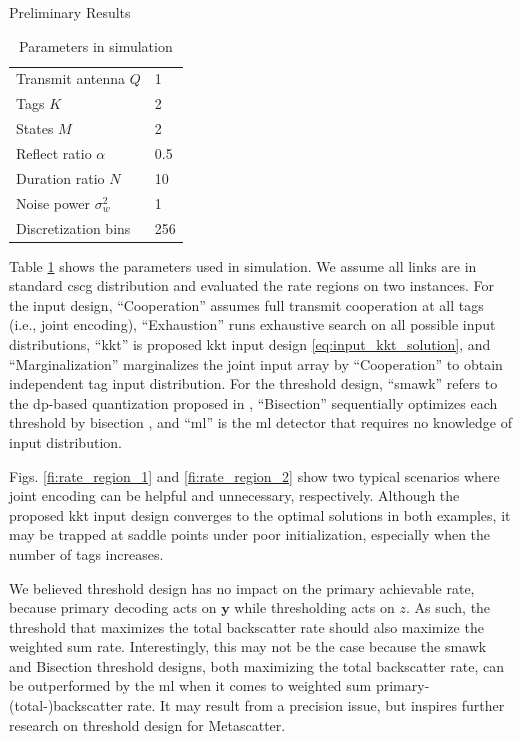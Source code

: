 \documentclass[journal]{IEEEtran}
\begin{document}
\begin{section}{Preliminary Results}
	\begin{table}[t!]
		\centering
		\caption{Parameters in simulation}
		\begin{tabular}{ll}
			Transmit antenna $Q$     & 1   \\
			Tags $K$                 & 2   \\
			States $M$               & 2   \\
			Reflect ratio $\alpha$   & 0.5 \\
			Duration ratio $N$       & 10  \\
			Noise power $\sigma_w^2$ & 1   \\
			Discretization bins      & 256
		\end{tabular}
		\label{ta:parameters}
	\end{table}
	Table \ref{ta:parameters} shows the parameters used in simulation.
	We assume all links are in standard \gls{cscg} distribution and evaluated the rate regions on two instances.
	For the input design, ``Cooperation'' assumes full transmit cooperation at all tags (i.e., joint encoding), ``Exhaustion'' runs exhaustive search on all possible input distributions, ``\gls{kkt}'' is proposed \gls{kkt} input design \eqref{eq:input_kkt_solution}, and ``Marginalization'' marginalizes the joint input array by ``Cooperation'' to obtain independent tag input distribution.
	For the threshold design, ``\gls{smawk}'' refers to the \gls{dp}-based quantization proposed in \cite{He2021}, ``Bisection'' sequentially optimizes each threshold by bisection \cite{Nguyen2020a}, and ``\gls{ml}'' is the \gls{ml} detector that requires no knowledge of input distribution.

	Figs. \ref{fi:rate_region_1} and \ref{fi:rate_region_2} show two typical scenarios where joint encoding can be helpful and unnecessary, respectively.
	Although the proposed \gls{kkt} input design converges to the optimal solutions in both examples, it may be trapped at saddle points under poor initialization, especially when the number of tags increases.

	We believed threshold design has no impact on the primary achievable rate, because primary decoding acts on $\boldsymbol{y}$ while thresholding acts on $z$.
	As such, the threshold that maximizes the total backscatter rate should also maximize the weighted sum rate.
	Interestingly, this may not be the case because the \gls{smawk} and Bisection threshold designs, both maximizing the total backscatter rate, can be outperformed by the \gls{ml} when it comes to weighted sum primary-(total-)backscatter rate.
	It may result from a precision issue, but inspires further research on threshold design for Metascatter.


\end{section}
\end{document}
